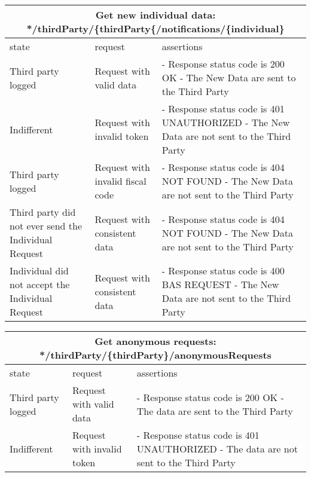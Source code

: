 \begin{center}
	\begin{tabular}{|p{}|p{}|p{}|}
		\hline
		\multicolumn{3}{c}{Get new individual data: */thirdParty/\{thirdParty\{/notifications/\{individual\}}\\

		\hline
		state & request & assertions \\
		
		\hline
		Third party logged&
		Request with valid data & 
		- Response status code is 200 OK\newline
		- The New Data are sent to the Third Party
		\\
		
		\hline
		Indifferent&
		Request with invalid token & 
		- Response status code is 401 UNAUTHORIZED \newline
		- The New Data are not sent to the Third Party
		\\
		\hline
		Third party logged&
		Request with invalid fiscal code & 
		- Response status code is 404 NOT FOUND\newline
		- The New Data are not sent to the Third Party
		\\
		\hline
		Third party did not ever send the Individual Request&
		Request with consistent data & 
		- Response status code is 404 NOT FOUND\newline
		- The New Data are not sent to the Third Party
		\\
		\hline
		Individual did not accept the Individual Request&
		Request with consistent data & 
		- Response status code is 400 BAS REQUEST\newline
		- The New Data are not sent to the Third Party
		\\
		\hline
	\end{tabular}
\end{center}

\begin{center}
	\begin{tabular}{|p{}|p{}|p{}|}
		\hline
		\multicolumn{3}{c}{Get anonymous requests: */thirdParty/\{thirdParty\}/anonymousRequests}\\

		\hline
		state & request & assertions \\
		
		\hline
		Third party logged&
		Request with valid data & 
		- Response status code is 200 OK\newline
		- The data are sent to the Third Party
		\\
		
		\hline
		Indifferent&
		Request with invalid token & 
		- Response status code is 401 UNAUTHORIZED \newline
		- The data are not sent to the Third Party
		\\
		\hline
	\end{tabular}
\end{center}

